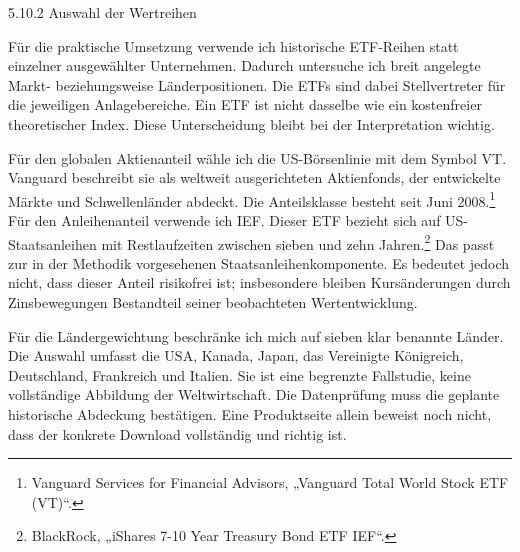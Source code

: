 \documentclass[
  ngerman,
  a4paper,
  DIV=11,
  oneside]{scrreprt}
\begin{document}
5.10.2 Auswahl der Wertreihen

Für die praktische Umsetzung verwende ich historische ETF-Reihen statt
einzelner ausgewählter Unternehmen. Dadurch untersuche ich breit
angelegte Markt- beziehungsweise Länderpositionen. Die ETFs sind dabei
Stellvertreter für die jeweiligen Anlagebereiche. Ein ETF ist nicht
dasselbe wie ein kostenfreier theoretischer Index. Diese Unterscheidung
bleibt bei der Interpretation wichtig.

Für den globalen Aktienanteil wähle ich die US-Börsenlinie mit dem
Symbol VT. Vanguard beschreibt sie als weltweit ausgerichteten
Aktienfonds, der entwickelte Märkte und Schwellenländer abdeckt. Die
Anteilsklasse besteht seit Juni 2008.\footnote{Vanguard Services for
  Financial Advisors, {„Vanguard {Total World Stock ETF} ({VT})``}.} Für
den Anleihenanteil verwende ich IEF. Dieser ETF bezieht sich auf
US-Staatsanleihen mit Restlaufzeiten zwischen sieben und zehn
Jahren.\footnote{BlackRock, {„{iShares} 7-10 {Year Treasury Bond ETF}
  \textbar{} {IEF}``}.} Das passt zur in der Methodik vorgesehenen
Staatsanleihenkomponente. Es bedeutet jedoch nicht, dass dieser Anteil
risikofrei ist; insbesondere bleiben Kursänderungen durch Zinsbewegungen
Bestandteil seiner beobachteten Wertentwicklung.

Für die Ländergewichtung beschränke ich mich auf sieben klar benannte
Länder. Die Auswahl umfasst die USA, Kanada, Japan, das Vereinigte
Königreich, Deutschland, Frankreich und Italien. Sie ist eine begrenzte
Fallstudie, keine vollständige Abbildung der Weltwirtschaft. Die
Datenprüfung muss die geplante historische Abdeckung bestätigen. Eine
Produktseite allein beweist noch nicht, dass der konkrete Download
vollständig und richtig ist.
\end{document}
